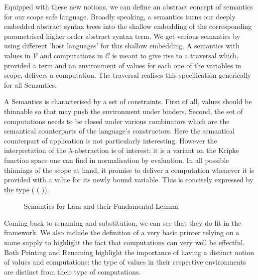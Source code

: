 Equipped with these new notions, we can define an abstract
concept of semantics for our scope safe language. Broadly
speaking, a semantics turns our deeply embedded abstract
syntax trees into the shallow embedding of the corresponding
parametrised higher order abstract syntax term. We get various
semantics by using different 'host languages' for this shallow
embedding. A semantics with values in $\mathcal{V}$ and
computations in $\mathcal{C}$ is meant to give rise to a
traversal which, provided a term and an environment of values
for each one of the variables in scope, delivers a computation.
The traversal  realises this specification generically
for all Semantics.

A Semantics is characterised by a set of constraints. First of all,
values should be thinnable so that  may push the environment
under binders. Second, the set of computations needs to be closed
under various combinators which are the semantical counterparts of
the language's constructors. Here the semantical counterpart of
application is not particularly interesting. However the interpretation
of the $\lambda$-abstraction is of interest: it is a variant on
the Kripke function space one can find in normalisation by evaluation.
In all possible thinnings of the scope at hand, it promise to deliver
a computation whenever it is provided with a value for its newly
bound variable. This is concisely expressed by the type
( (  )).

\begin{figure}[h]
\begin{minipage}{0.45\textwidth}
\end{minipage}\hspace{2em}
\begin{minipage}{0.45\textwidth}
\end{minipage}
\caption{Semantics for Lam and their Fundamental Lemma}
\end{figure}

Coming back to renaming and substitution, we can see that they do fit
in the  framework. We also include the definition of a very
basic printer relying on a name supply to highlight the fact that
computations can very well be effectful. Both Printing and Renaming
highlight the importance of having a distinct notion of values and
computations: the type of values in their respective environments
are distinct from their type of computations.

